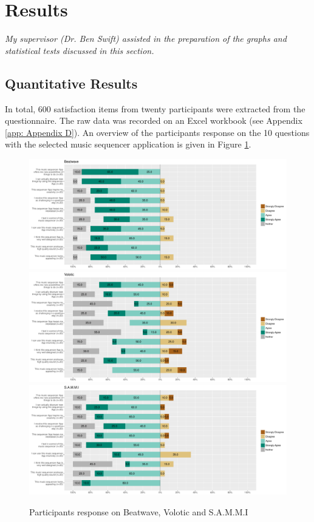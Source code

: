 \section{Results}

\emph{My supervisor (Dr. Ben Swift) assisted in the preparation of the graphs
and statistical tests discussed in this section.}

\subsection{Quantitative Results}

In total, 600 satisfaction items from twenty participants were extracted from the questionnaire. The raw data was recorded on an Excel workbook (see Appendix \ref{app: Appendix D}). An overview of the participants response on the 10 questions with the selected music sequencer application is given in Figure \ref{fig: result_response}.

\begin{figure}[h]
 \centering
 \includegraphics[width = \textwidth]{images/Beatwave.pdf}
 \includegraphics[width = \textwidth]{images/Volotic.pdf}
 \includegraphics[width = \textwidth]{images/SAMMI.pdf}
 \caption{Participants response on Beatwave, Volotic and S.A.M.M.I}
 \label{fig: result_response}
\end{figure}

